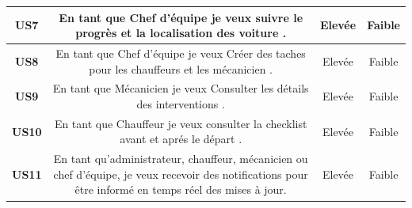 \begin{table}[htbp]
\begin{tabular}{|c|c|c|c|}

    \hline
    \textbf{US7}  & \parbox{9cm}{\centering En tant que Chef d'équipe je veux suivre le progrès et la localisation des voiture .}                                                                    & Elevée            & Faible          \\
    \hline
    \textbf{US8}  & \parbox{9cm}{\centering En tant que Chef d'équipe je veux Créer des taches pour les chauffeurs et les mécanicien .}                                                              & Elevée            & Faible          \\
    \hline
    \textbf{US9}  & \parbox{9cm}{\centering En tant que Mécanicien je veux Consulter les détails des interventions .}                                                                                & Elevée            & Faible          \\
    \hline
    \textbf{US10} & \parbox{9cm}{\centering En tant que Chauffeur je veux consulter la checklist avant et aprés le départ . }                                                                        & Elevée            & Faible          \\


    \hline
    \textbf{US11} & \parbox{9cm}{\centering En tant qu’administrateur, chauffeur, mécanicien ou chef d’équipe, je veux recevoir des notifications pour être informé en temps réel des mises à jour.} & Elevée            & Faible          \\
    \hline
  \end{tabular}
\end{table}




